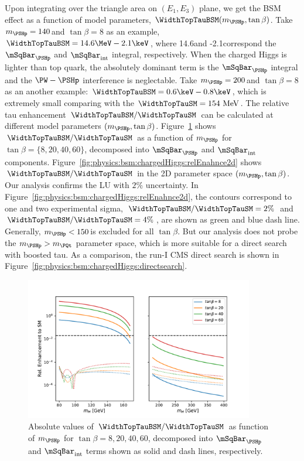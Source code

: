 \noindent Upon integrating over the triangle area on  $(E_1, E_3)$ plane, we get the BSM effect as a function of model parameters, $\WidthTopTauBSM (m_{\PSHp}, \tan\beta)$. Take $m_{\PSHp} = 140 $\GeV and $\tan\beta=8$ as an example, $\WidthTopTauBSM= 14.6 \MeV - 2.1 \keV$, where 14.6\MeV and  -2.1\keV correspond the  $\mSqBar _{\PSHp}$ and $\mSqBar _{\mathrm{int}}$ integral, respectively. When the charged Higgs is  lighter than top quark, the absolutely dominant term is the $\mSqBar _{\PSHp}$ integral and the $\PW-\PSHp$ interference is neglectable. Take $m_{\PSHp} = 200 $\GeV and $\tan\beta=8$ as an another example: $\WidthTopTauBSM = 0.6 \keV - 0.8 \keV$, which is extremely small comparing with the $\WidthTopTauSM= 154 \text{ MeV}$. The relative tau enhancement $\WidthTopTauBSM/\WidthTopTauSM$ can be calculated at different model parameters $(m_{\PSHp}, \tan\beta)$. Figure~\ref{fig:physics:bsm:chargedHiggs:relEnhance1d} shows  $\WidthTopTauBSM/\WidthTopTauSM$ as a function of $m_{\PSHp}$ for $\tan\beta= \{8,20,40,60\}$, decomposed into $\mSqBar _{\PSHp}$ and $\mSqBar _{\mathrm{int}}$  components. Figure~\ref{fig:physics:bsm:chargedHiggs:relEnahnce2d} shows $\WidthTopTauBSM/\WidthTopTauSM$ in the 2D parameter space $(m_{\PSHp}, \tan\beta)$. Our analysis confirms the LU with $2\%$ uncertainty. In  Figure~\ref{fig:physics:bsm:chargedHiggs:relEnahnce2d}, the contours correspond to one and two experimental sigma, $\WidthTopTauBSM/\WidthTopTauSM = 2\%$ and $\WidthTopTauBSM/\WidthTopTauSM = 4\%$, are shown as green and blue dash line. Generally, $m_{\PSHp} < 150$\GeV is excluded for all $\tan\beta$. But our analysis does not probe the $m_{\PSHp} >m_\PQt$ parameter space, which is more suitable for a direct search with boosted tau. As a comparison, the run-I CMS direct search \cite{Khachatryan:2015qxa} is shown in Figure~\ref{fig:physics:bsm:chargedHiggs:directsearch}.


\begin{figure}[ht]
    \centering
    \includegraphics[width=0.89\textwidth]{chapters/Physics/sectionBSM/figures/RelEnhance2HDM_1d.pdf}
    \caption{ Absolute values of $\WidthTopTauBSM/\WidthTopTauSM$ as function of $m_{\PSHp}$ for $\tan\beta= 8,20,40,60$, decomposed into $\mSqBar _{\PSHp}$ and $\mSqBar _{\mathrm{int}}$  terms shown as solid and dash lines, respectively. }
    \label{fig:physics:bsm:chargedHiggs:relEnhance1d}
\end{figure}







